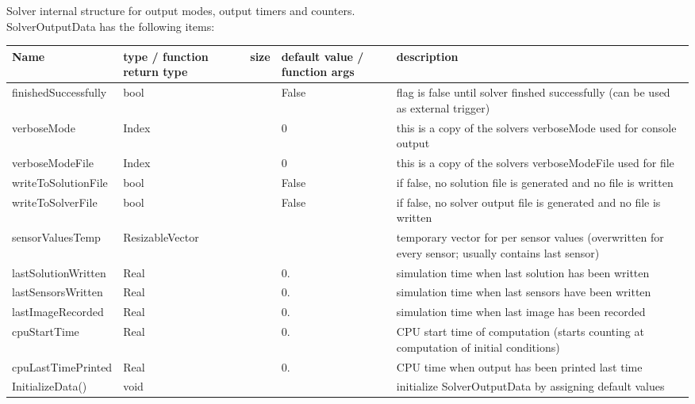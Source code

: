  \label{sec_SolverOutputData}
Solver internal structure for output modes, output timers and counters.\\ 
%
SolverOutputData has the following items:
\begin{center}
  \footnotesize
  \begin{longtable}{| p{4.2cm} | p{2.5cm} | p{0.3cm} | p{3.0cm} | p{6cm} |}
    \hline
    \bf Name & \bf type / function return type & \bf size & \bf default value / function args & \bf description \\ \hline
    finishedSuccessfully &     bool &      &     False &     flag is false until solver finshed successfully (can be used as external trigger)\\ \hline
    verboseMode &     Index &      &     0 &     this is a copy of the solvers verboseMode used for console output\\ \hline
    verboseModeFile &     Index &      &     0 &     this is a copy of the solvers verboseModeFile used for file\\ \hline
    writeToSolutionFile &     bool &      &     False &     if false, no solution file is generated and no file is written\\ \hline
    writeToSolverFile &     bool &      &     False &     if false, no solver output file is generated and no file is written\\ \hline
    sensorValuesTemp &     ResizableVector &      &      &     temporary vector for per sensor values (overwritten for every sensor; usually contains last sensor)\\ \hline
    lastSolutionWritten &     Real &      &     0. &     simulation time when last solution has been written\\ \hline
    lastSensorsWritten &     Real &      &     0. &     simulation time when last sensors have been written\\ \hline
    lastImageRecorded &     Real &      &     0. &     simulation time when last image has been recorded\\ \hline
    cpuStartTime &     Real &      &     0. &     CPU start time of computation (starts counting at computation of initial conditions)\\ \hline
    cpuLastTimePrinted &     Real &      &     0. &     CPU time when output has been printed last time\\ \hline
    InitializeData() &     void &      &      &     initialize SolverOutputData by assigning default values\\ \hline
	  \end{longtable}
	\end{center}

